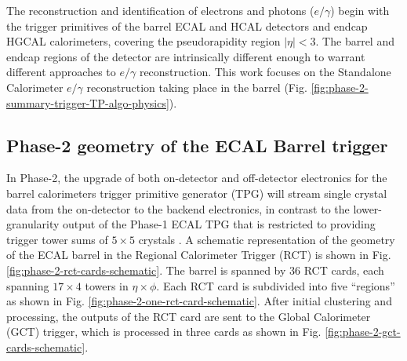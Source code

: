The reconstruction and identification of electrons and photons ($e/\gamma$) begin with the trigger primitives of the barrel ECAL and HCAL detectors and endcap HGCAL calorimeters, covering the pseudorapidity region $|\eta| < 3$. The barrel and endcap regions of the detector are intrinsically different enough to warrant different approaches to $e/\gamma$ reconstruction. This work focuses on the Standalone Calorimeter $e/\gamma$ reconstruction taking place in the barrel (Fig. \ref{fig:phase-2-summary-trigger-TP-algo-physics}).

\subsection{Phase-2 geometry of the ECAL Barrel trigger}
\label{section:phase-2-ECAL-barrel-geometry}
In Phase-2, the upgrade of both on-detector and off-detector electronics for the barrel calorimeters trigger primitive generator (TPG) will stream single crystal data from the on-detector to the backend electronics, in contrast to the lower-granularity output of the Phase-1 ECAL TPG that is restricted to providing trigger tower sums of $5 \times 5$ crystals \cite{CMS-TDR-021}. 
A schematic representation of the geometry of the ECAL barrel in the Regional Calorimeter Trigger (RCT) is shown in Fig. \ref{fig:phase-2-rct-cards-schematic}. The barrel is spanned by 36 RCT cards, each spanning $17 \times 4$ towers in $\eta \times \phi$. Each RCT card is subdivided into five ``regions'' as shown in Fig. \ref{fig:phase-2-one-rct-card-schematic}. After initial clustering and processing, the outputs of the RCT card are sent to the Global Calorimeter (GCT) trigger, which is processed in three cards as shown in Fig. \ref{fig:phase-2-gct-cards-schematic}.

